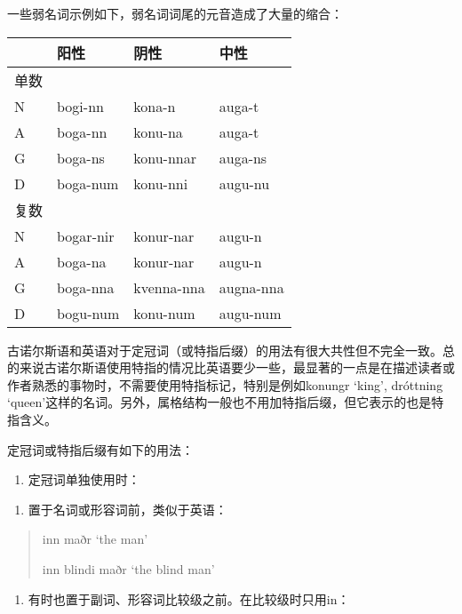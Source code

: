 一些弱名词示例如下，弱名词词尾的元音造成了大量的缩合：

\begin{longtable}{llll}
  \toprule
       & 阳性      & 阴性       & 中性      \\
  \midrule
  \endhead
  \bottomrule
  \endfoot
  单数 &           &            &           \\
  N    & bogi-nn   & kona-n     & auga-t    \\
  A    & boga-nn   & konu-na    & auga-t    \\
  G    & boga-ns   & konu-nnar  & auga-ns   \\
  D    & boga-num  & konu-nni   & augu-nu   \\
  复数 &           &            &           \\
  N    & bogar-nir & konur-nar  & augu-n    \\
  A    & boga-na   & konur-nar  & augu-n    \\
  G    & boga-nna  & kvenna-nna & augna-nna \\
  D    & bogu-num  & konu-num   & augu-num  \\
\end{longtable}

古诺尔斯语和英语对于定冠词（或特指后缀）的用法有很大共性但不完全一致。总的来说古诺尔斯语使用特指的情况比英语要少一些，最显著的一点是在描述读者或作者熟悉的事物时，不需要使用特指标记，特别是例如konungr
`king', dróttning
`queen'这样的名词。另外，属格结构一般也不用加特指后缀，但它表示的也是特指含义。

定冠词或特指后缀有如下的用法：

\begin{enumerate}
  \def\labelenumi{\Alph{enumi}.}
  \item
        定冠词单独使用时：
\end{enumerate}

\begin{enumerate}
  \def\labelenumi{\arabic{enumi})}
  \item
        置于名词或形容词前，类似于英语：
\end{enumerate}

\begin{quote}
  inn maðr `the man'

  inn blindi maðr `the blind man'
\end{quote}

\begin{enumerate}
  \def\labelenumi{\arabic{enumi})}
  \setcounter{enumi}{1}
  \item
        有时也置于副词、形容词比较级之前。在比较级时只用in：
\end{enumerate}

